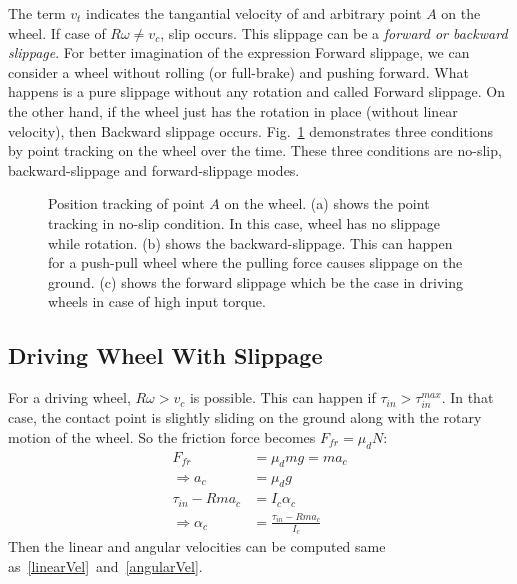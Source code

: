 \documentclass[letterpaper, 10pt, conference]{ieeeconf}
\begin{document}
The term $v_t$ indicates the tangantial velocity of and arbitrary point $A$ on the wheel. If case of $R\omega \neq v_c$, slip occurs. This slippage can be a \emph{forward or backward slippage}. For better imagination of the expression Forward slippage, we can consider a wheel without rolling (or full-brake) and pushing forward. What happens is a pure slippage without any rotation and called Forward slippage. On the other hand, if the wheel just has the rotation in place (without linear velocity), then Backward slippage occurs. Fig.~\ref{SlipDiagram} demonstrates three conditions by point tracking on the wheel over the time. These three conditions are no-slip, backward-slippage and forward-slippage modes.

\begin{figure}[!h] 
	\caption{Position tracking of point $A$ on the wheel. (a) shows the point tracking in no-slip condition. In this case, wheel has no slippage while rotation. (b) shows the backward-slippage. This can happen for a push-pull wheel where the pulling force causes slippage on the ground. (c) shows the forward slippage which be the case in driving wheels in case of high input torque.}
	
	\label{SlipDiagram}
\end{figure}


\subsection{Driving Wheel With Slippage} \label{DWSlip}
For a driving wheel, $R\omega > v_c$ is possible. This can happen if $\tau_{in} > \tau_{in}^{max}$. In that case, the contact point is slightly sliding on the ground along with the rotary motion of the wheel. So the friction force becomes $F_{fr} = \mu_d N$:
\begin{align}
F_{fr} &= \mu_d mg = ma_c \\
\Rightarrow a_c &= \mu_dg \\
\tau_{in} - Rma_c &= I_c \alpha_c \\
\Rightarrow \alpha_c &= \frac{\tau_{in} - Rma_c}{I_c}
\end{align}
Then the linear and angular velocities can be computed same as~\eqref{linearVel}~and~\eqref{angularVel}.
\end{document}
